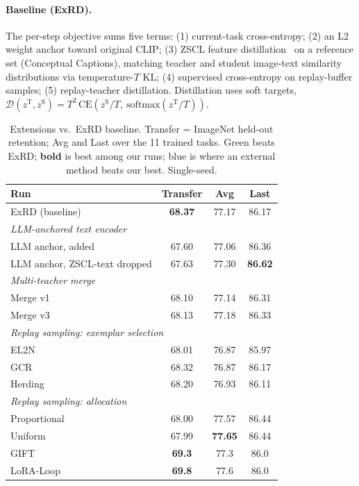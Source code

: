 \documentclass[11pt]{article}
\newcommand{\teach}{\mathrm{T}}
\newcommand{\stud}{\mathrm{S}}
\newcommand{\up}[1]{\cellcolor{green!16}#1}              %
\newcommand{\best}[1]{\textbf{#1}}                       %
\newcommand{\extbest}[1]{\cellcolor{blue!15}\textbf{#1}} %
\begin{document}
\paragraph{Baseline (ExRD).} The per-step objective sums five terms: (1) current-task cross-entropy;
(2) an L2 weight anchor toward original CLIP; (3) ZSCL feature distillation~\cite{zscl} on a
reference set (Conceptual Captions), matching teacher and student image-text similarity distributions
via temperature-$T$ KL; (4) supervised cross-entropy on replay-buffer samples; (5) replay-teacher
distillation. Distillation uses soft targets,
$\mathcal{D}(z^{\teach},z^{\stud}) = T^2\,\mathrm{CE}(z^{\stud}/T,\ \mathrm{softmax}(z^{\teach}/T))$.

\begin{table}[h]
  \centering
  \caption{Extensions vs.\ ExRD baseline. Transfer = ImageNet held-out retention; Avg and Last over
  the 11 trained tasks. Green beats ExRD; \textbf{bold} is best among our runs; blue is where an
  external method beats our best. Single-seed.}
  \label{tab:extensions}
  \begin{tabular}{lccc}
  \toprule
  Run & Transfer & Avg & Last \\
  \midrule
  ExRD (baseline) & \best{68.37} & 77.17 & 86.17 \\
  \midrule
  \multicolumn{4}{l}{\emph{LLM-anchored text encoder}}\\
  LLM anchor, added             & 67.60 & 77.06 & \up{86.36} \\
  LLM anchor, ZSCL-text dropped & 67.63 & \up{77.30} & \up{\best{86.62}} \\
  \midrule
  \multicolumn{4}{l}{\emph{Multi-teacher merge}}\\
  Merge v1 & 68.10 & 77.14 & \up{86.31} \\
  Merge v3 & 68.13 & \up{77.18} & \up{86.33} \\
  \midrule
  \multicolumn{4}{l}{\emph{Replay sampling: exemplar selection}}\\
  EL2N    & 68.01 & 76.87 & 85.97 \\
  GCR     & 68.32 & 76.87 & 86.17 \\
  Herding & 68.20 & 76.93 & 86.11 \\
  \multicolumn{4}{l}{\emph{Replay sampling: allocation}}\\
  Proportional & 68.00 & \up{77.57} & \up{86.44} \\
  Uniform      & 67.99 & \up{\best{77.65}} & \up{86.44} \\
  \midrule
  GIFT      & \extbest{69.3} & 77.3 & 86.0 \\
  LoRA-Loop & \extbest{69.8} & 77.6 & 86.0 \\
  \bottomrule
  \end{tabular}
\end{table}
\end{document}
